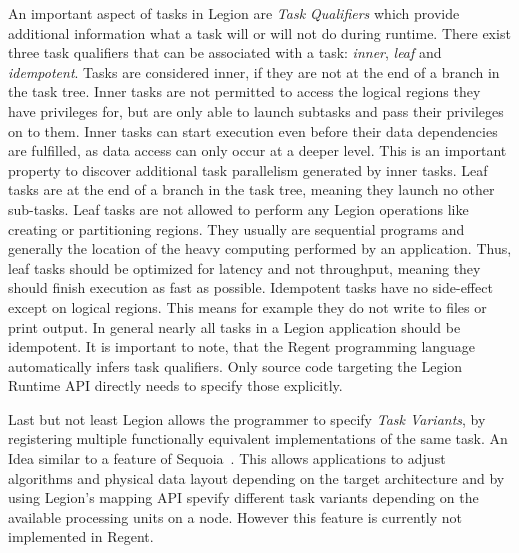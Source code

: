 \documentclass{article}      %
\begin{document}
An important aspect of tasks in Legion are \emph{Task Qualifiers} which provide additional information what a task will or will not do during runtime.  There exist three task qualifiers that can be associated with a task: \emph{inner}, \emph{leaf} and \emph{idempotent}. Tasks are considered inner, if they are not at the end of a branch in the task tree. Inner tasks are not permitted to access the logical regions they have privileges for, but are only able to launch subtasks and pass their privileges on to them. Inner tasks can start execution even before their data dependencies are fulfilled, as data access can only occur at a deeper level. This is an important property to discover additional task parallelism generated by inner tasks. Leaf tasks are at the end of a branch in the task tree, meaning they launch no other sub-tasks. Leaf tasks are not allowed to perform any Legion operations like creating or partitioning regions. They usually are sequential programs and generally the location of the heavy computing performed by an application. Thus, leaf tasks should be optimized for latency and not throughput, meaning they should finish execution as fast as possible. Idempotent tasks have no side-effect except on logical regions. This means for example they do not write to files or print output. In general nearly all tasks in a Legion application should be idempotent. It is important to note, that the Regent programming language automatically infers task qualifiers. Only source code targeting the Legion Runtime API directly needs to specify those explicitly.

Last but not least Legion allows the programmer to specify \emph{Task Variants}, by registering multiple functionally equivalent implementations of the same task. An Idea similar to a feature of Sequoia~\cite{sequoia}. This allows applications to adjust algorithms and physical data layout depending on the target architecture and by using Legion's mapping API spevify different task variants depending on the available processing units on a node. However this feature is currently not implemented in Regent.
\end{document}
